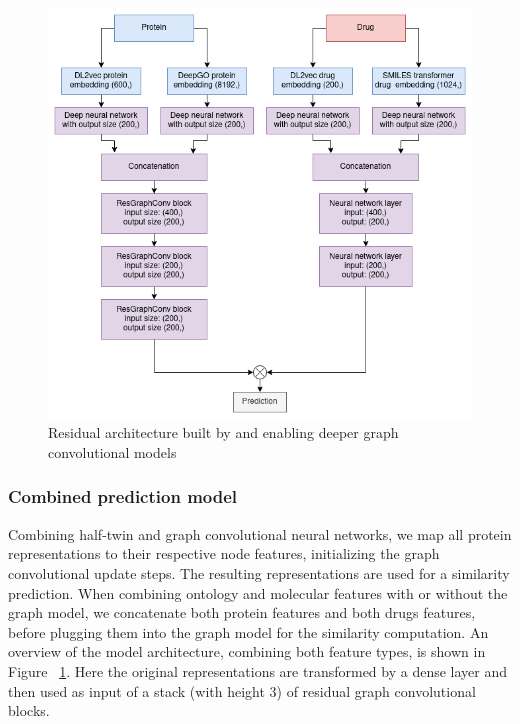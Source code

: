\documentclass{bioinfo}
\begin{document}
\begin{figure}[!tpb]%
	\centerline{\includegraphics[width=1\columnwidth]{figures/full_model_all_layers.png}}
	\caption{Residual architecture built by \citet{DeepGCN2019} and \citet{DeeperGCN2020} enabling deeper graph convolutional models}
	\label{fig:FullModelAllLayers}
\end{figure}

\subsubsection{Combined prediction model}
Combining half-twin and graph convolutional neural networks, we map
all protein representations to their respective node features,
initializing the graph convolutional update steps. The resulting
representations are used for a similarity prediction.
When combining ontology and molecular features with or without the
graph model, we concatenate both protein features and both drugs
features, before plugging them into the graph model for the similarity
computation. An overview of the model architecture, combining both
feature types, is shown in Figure ~\ref{fig:FullModelAllLayers}. Here
the original representations are transformed by a dense layer and then
used as input of a stack (with height 3) of residual graph
convolutional blocks.
\end{document}
